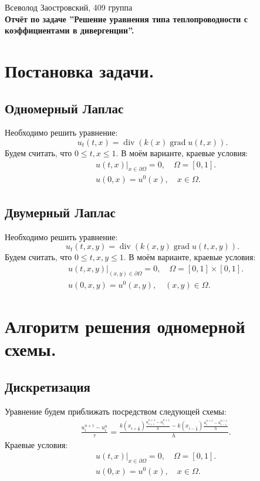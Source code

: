 \documentclass[14pt,a4paper]{extarticle}
\newcommand{\1}{\mathbbm{1}}
\begin{document}
\begin{center}
    {Всеволод Заостровский, 409 группа}\\
    {\bfseries Отчёт по задаче ''Решение уравнения типа теплопроводности с коэффициентами в дивергенции''.\\}
    \vspace{1cm}
\end{center}

\tableofcontents

\section{Постановка задачи.} \label{diffeq1}
\subsection{Одномерный Лаплас}
Необходимо решить уравнение:
\begin{equation*} 
    u_t(t, x) = \operatorname{div} (k(x) \operatorname{grad} u(t, x)).
\end{equation*}
Будем считать, что $0 \leq t,x \leq 1$. В моём варианте, краевые условия:
\begin{align*} 
    &u(t, x) \big| _{x \in \partial \Omega} = 0, \quad \Omega = [0,1]. \\
    &u(0, x) = u^0(x), \quad x \in \Omega. 
\end{align*}

\subsection{Двумерный Лаплас}
Необходимо решить уравнение:
\begin{equation*} 
    u_t(t, x, y) = \operatorname{div} (k(x, y) \operatorname{grad} u(t, x, y)).
\end{equation*}
Будем считать, что $0 \leq t,x,y \leq 1$. В моём варианте, краевые условия:
\begin{align*} 
    &u(t, x, y) \big| _{(x ,y) \in \partial \Omega} = 0, \quad \Omega = [0,1] \times [0,1]. \\
    &u(0, x, y) = u^0(x, y), \quad (x, y) \in \Omega. 
\end{align*}

\section{Алгоритм решения одномерной схемы.}
\subsection{Дискретизация}
Уравнение будем приближать посредством следующей схемы:
\begin{align*}
    &\frac{u^{n+1}_i - u^n_i}{\tau} = \frac{k(x_{i + \frac{1}{2}}) \frac{u^{n+1}_{i+1} - u^{n+1}_{i}}{h} - k(x_{i- \frac{1}{2}}) \frac{u^{n+1}_{i} - u^{n+1}_{i-1}}{h}}{h}.
\end{align*}
Краевые условия:
\begin{align*} 
    &u(t, x) \big| _{x \in \partial \Omega} = 0, \quad \Omega = [0,1]. \\
    &u(0, x) = u^0(x), \quad x \in \Omega. 
\end{align*}
\end{document}
